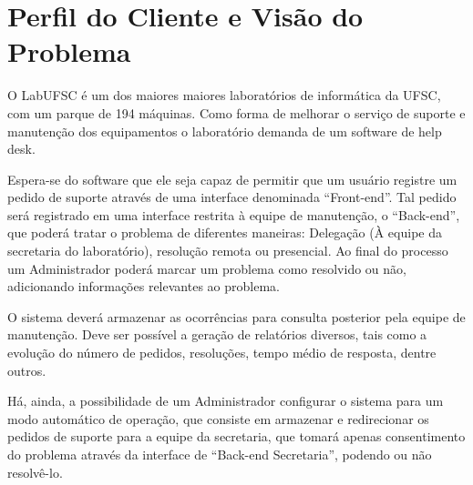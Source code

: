 \documentclass[brazil,times]{abnt}
\begin{document}






\capa

\folhaderosto

\tableofcontents

\chapter{Perfil do Cliente e Visão do Problema}
O LabUFSC é um dos maiores maiores laboratórios de informática da UFSC, com um
parque de 194 máquinas. Como forma de melhorar o serviço de 
suporte e manutenção dos equipamentos o laboratório demanda de um software de
help desk.

Espera-se do software que ele seja capaz de permitir que um usuário registre um
pedido de suporte através de uma interface denominada “Front-end”. Tal pedido
será registrado em uma interface restrita à equipe de manutenção, o “Back-end”,
que poderá tratar o problema de diferentes maneiras: Delegação (À equipe da
secretaria do laboratório), resolução remota ou presencial. Ao final do
processo um Administrador poderá marcar um problema como resolvido ou não,
adicionando informações relevantes ao problema.

O sistema deverá armazenar as ocorrências para consulta posterior pela equipe
de manutenção. Deve ser possível a geração de relatórios diversos, tais como a
evolução do número de pedidos, resoluções, tempo médio de resposta, dentre
outros.

Há, ainda, a possibilidade de um Administrador configurar o sistema para um
modo automático de operação, que consiste em armazenar e redirecionar os
pedidos de suporte para a equipe da secretaria, que tomará apenas consentimento
do problema através da interface de “Back-end Secretaria”, podendo ou não resolvê-lo.
\end{document}
